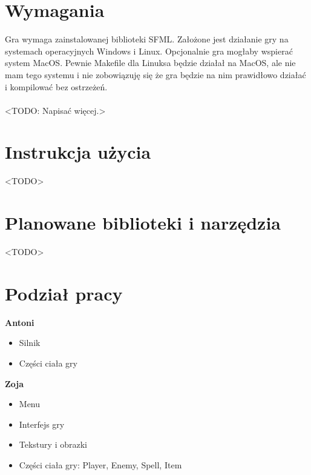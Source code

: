 \documentclass[12pt, titlepage]{article}
\begin{document}
\section{Wymagania}
Gra wymaga zainstalowanej biblioteki
SFML. Założone jest działanie gry
na systemach operacyjnych Windows i
Linux. Opcjonalnie gra mogłaby wspierać
system MacOS. Pewnie Makefile dla Linuksa
będzie działał na MacOS, ale nie mam tego
systemu i nie zobowiązuję się że gra będzie
na nim prawidłowo działać i kompilować
bez ostrzeżeń.
\\~\\
<TODO: Napisać więcej.>

\section{Instrukcja użycia}
<TODO>

\section{Planowane biblioteki i narzędzia}
<TODO>

\section{Podział pracy}
\textbf{Antoni}
\begin{itemize}
	\item Silnik
	\item Części ciała gry
\end{itemize}
 
\textbf{Zoja}
\begin{itemize}
	\item Menu
	\item Interfejs gry
	\item Tekstury i obrazki
	\item Części ciała gry: Player, Enemy, Spell, Item
\end{itemize}
\end{document}
